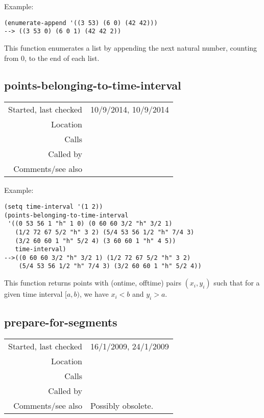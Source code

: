 \vspace{0.5cm}
\noindent Example:
\begin{verbatim}
(enumerate-append '((3 53) (6 0) (42 42)))
--> ((3 53 0) (6 0 1) (42 42 2))
\end{verbatim}

\noindent This function enumerates a list by appending
the next natural number, counting from 0, to the end
of each list.


\subsection*{points-belonging-to-time-interval}\label{fun:points-belonging-to-time-interval}

\vspace{0.3cm}
\begin{tabular}{r|p{8cm}}
Started, last checked & 10/9/2014, 10/9/2014 \\
Location & \nameref{sec:segmentation} \\
Calls & \\
Called by & \nameref{fun:segments-strict} \\
Comments/see also &
\end{tabular}

\vspace{0.5cm}
\noindent Example:
\begin{verbatim}
(setq time-interval '(1 2))
(points-belonging-to-time-interval
 '((0 53 56 1 "h" 1 0) (0 60 60 3/2 "h" 3/2 1)
   (1/2 72 67 5/2 "h" 3 2) (5/4 53 56 1/2 "h" 7/4 3)
   (3/2 60 60 1 "h" 5/2 4) (3 60 60 1 "h" 4 5))
   time-interval)
-->((0 60 60 3/2 "h" 3/2 1) (1/2 72 67 5/2 "h" 3 2)
    (5/4 53 56 1/2 "h" 7/4 3) (3/2 60 60 1 "h" 5/2 4))
\end{verbatim}

\noindent This function returns points with
(ontime, offtime) pairs $(x_i, y_i)$ such that for a
given time interval $[a, b)$, we have $x_i < b$ and
$y_i > a$.


\subsection*{prepare-for-segments}\label{fun:prepare-for-segments}

\vspace{0.3cm}
\begin{tabular}{r|p{8cm}}
Started, last checked & 16/1/2009, 24/1/2009 \\
Location & \nameref{sec:segmentation} \\
Calls & \nameref{fun:sort-by} \\
Called by & \nameref{fun:segments} \\
Comments/see also & Possibly obsolete.
\end{tabular}

